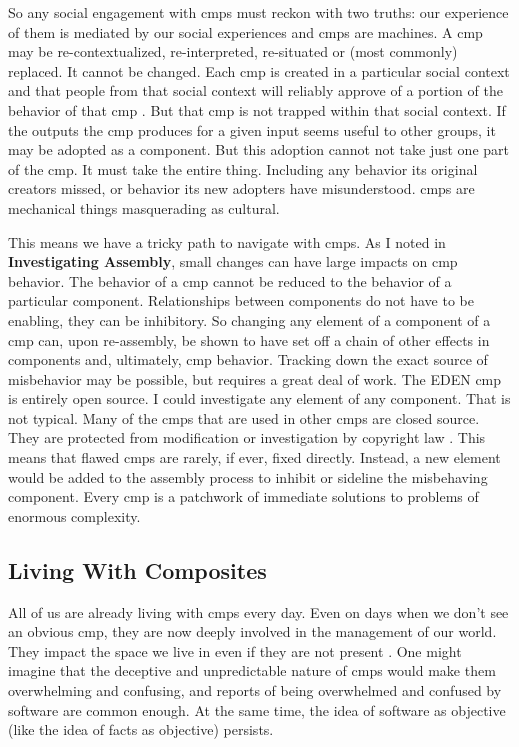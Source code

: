 \documentclass[a4paper,man,natbib,floatsintext]{apa6}
\begin{document}
  So any social engagement with \glspl{cmp} must reckon with two truths: our experience of them is mediated by our social experiences and \glspl{cmp} are machines. A \gls{cmp} may be re-contextualized, re-interpreted, re-situated or (most commonly) replaced. It cannot be changed. Each \gls{cmp} is created in a particular social context and that people from that social context will reliably approve of a portion of the behavior of that \gls{cmp} \citep{Mackenzie2006-hb}. But that \gls{cmp} is not trapped within that social context. If the outputs the \gls{cmp} produces for a given input seems useful to other groups, it may be adopted as a component. But this adoption cannot not take just one part of the \gls{cmp}. It must take the entire thing. Including any behavior its original creators missed, or behavior its new adopters have misunderstood. \Glspl{cmp} are mechanical things masquerading as cultural.

  This means we have a tricky path to navigate with \glspl{cmp}. As I noted in \textbf{Investigating Assembly}, small  changes can have large impacts on \gls{cmp} behavior. The behavior of a \gls{cmp} cannot be reduced to the behavior of a particular component. Relationships between components do not have to be enabling, they can be inhibitory. So changing any element of a component of a \gls{cmp} can, upon re-assembly, be shown to have set off a chain of other effects in components and, ultimately, \gls{cmp} behavior. Tracking down the exact source of misbehavior may be possible, but requires a great deal of work. The \gls{EDEN} \gls{cmp} is entirely open source. I could investigate any element of any component. That is not typical. Many of the \glspl{cmp} that are used in other \glspl{cmp} are closed source. They are protected from modification or investigation by copyright law \citep{Kelty2008-jm}. This means that flawed \glspl{cmp} are rarely, if ever, fixed directly. Instead, a new element would be added to the assembly process to inhibit or sideline the misbehaving component. Every \gls{cmp} is a patchwork of immediate solutions to problems of enormous complexity\footnotemark.


  \subsection{Living With Composites}
  All of us are already living with \glspl{cmp} every day. Even on days when we don't see an obvious \gls{cmp}, they are now deeply involved in the management of our world. They impact the space we live in even if they are not present \citep{Kitchin2011-af}. One might imagine that the deceptive and unpredictable nature of \glspl{cmp} would make them overwhelming and confusing, and reports of being overwhelmed and confused by software are common enough. At the same time, the idea of software as objective (like the idea of facts as objective) persists. 
\end{document}
